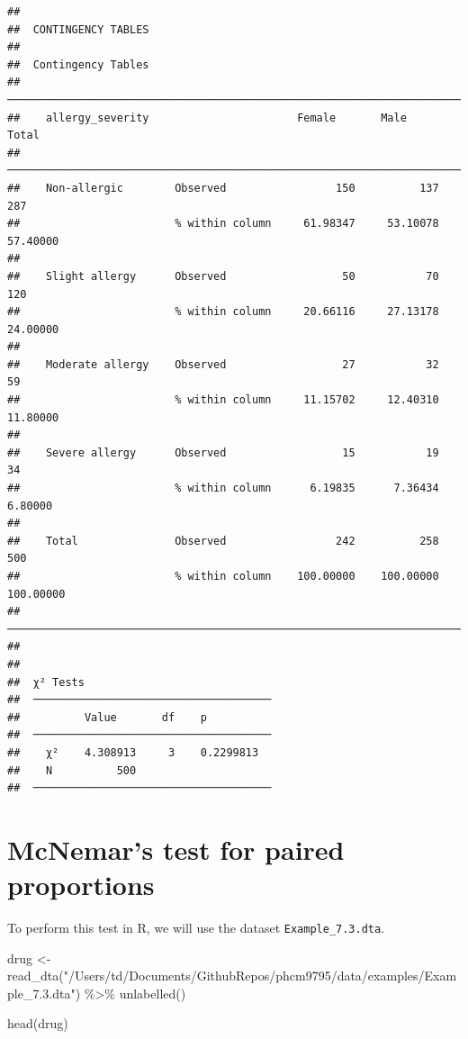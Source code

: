 \documentclass[
]{memoir}
\newenvironment{Shaded}{\begin{snugshade}}{\end{snugshade}}
\newcommand{\FunctionTok}[1]{\textcolor[rgb]{0.00,0.00,0.00}{#1}}
\newcommand{\NormalTok}[1]{#1}
\newcommand{\OtherTok}[1]{\textcolor[rgb]{0.56,0.35,0.01}{#1}}
\newcommand{\SpecialCharTok}[1]{\textcolor[rgb]{0.00,0.00,0.00}{#1}}
\newcommand{\StringTok}[1]{\textcolor[rgb]{0.31,0.60,0.02}{#1}}
\begin{document}
\begin{verbatim}
## 
##  CONTINGENCY TABLES
## 
##  Contingency Tables                                                             
##  ────────────────────────────────────────────────────────────────────────────── 
##    allergy_severity                       Female       Male         Total       
##  ────────────────────────────────────────────────────────────────────────────── 
##    Non-allergic        Observed                 150          137          287   
##                        % within column     61.98347     53.10078     57.40000   
##                                                                                 
##    Slight allergy      Observed                  50           70          120   
##                        % within column     20.66116     27.13178     24.00000   
##                                                                                 
##    Moderate allergy    Observed                  27           32           59   
##                        % within column     11.15702     12.40310     11.80000   
##                                                                                 
##    Severe allergy      Observed                  15           19           34   
##                        % within column      6.19835      7.36434      6.80000   
##                                                                                 
##    Total               Observed                 242          258          500   
##                        % within column    100.00000    100.00000    100.00000   
##  ────────────────────────────────────────────────────────────────────────────── 
## 
## 
##  χ² Tests                              
##  ───────────────────────────────────── 
##          Value       df    p           
##  ───────────────────────────────────── 
##    χ²    4.308913     3    0.2299813   
##    N          500                      
##  ─────────────────────────────────────
\end{verbatim}

\hypertarget{mcnemars-test-for-paired-proportions}{%
\section{McNemar's test for paired proportions}\label{mcnemars-test-for-paired-proportions}}

To perform this test in R, we will use the dataset \texttt{Example\_7.3.dta}.

\begin{Shaded}
\begin{Highlighting}[]
\NormalTok{drug }\OtherTok{\textless{}{-}} \FunctionTok{read\_dta}\NormalTok{(}\StringTok{"/Users/td/Documents/GithubRepos/phcm9795/data/examples/Example\_7.3.dta"}\NormalTok{) }\SpecialCharTok{\%\textgreater{}\%} 
  \FunctionTok{unlabelled}\NormalTok{()}

\FunctionTok{head}\NormalTok{(drug)}
\end{Highlighting}
\end{Shaded}
\end{document}
